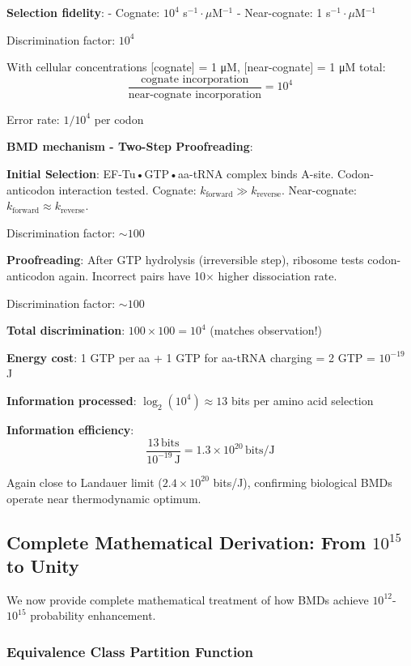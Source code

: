 \documentclass[11pt,onecolumn]{article}
\begin{document}
\textbf{Selection fidelity}: 
- Cognate: $10^4$ s$^{-1}\cdot\mu$M$^{-1}$
- Near-cognate: 1 s$^{-1}\cdot\mu$M$^{-1}$

Discrimination factor: $10^4$

With cellular concentrations [cognate] = 1 μM, [near-cognate] = 1 μM total:
\begin{equation}
\frac{\text{cognate incorporation}}{\text{near-cognate incorporation}} = 10^4
\end{equation}

Error rate: $1/10^4$ per codon

\textbf{BMD mechanism - Two-Step Proofreading}:

\textbf{Initial Selection}: EF-Tu•GTP•aa-tRNA complex binds A-site. Codon-anticodon interaction tested. Cognate: $k_{\text{forward}} \gg k_{\text{reverse}}$. Near-cognate: $k_{\text{forward}} \approx k_{\text{reverse}}$.

Discrimination factor: $\sim 100$

\textbf{Proofreading}: After GTP hydrolysis (irreversible step), ribosome tests codon-anticodon again. Incorrect pairs have 10$\times$ higher dissociation rate.

Discrimination factor: $\sim 100$

\textbf{Total discrimination}: $100 \times 100 = 10^4$ (matches observation!)

\textbf{Energy cost}: 1 GTP per aa + 1 GTP for aa-tRNA charging = 2 GTP = $10^{-19}$ J

\textbf{Information processed}: $\log_2(10^4) \approx 13$ bits per amino acid selection

\textbf{Information efficiency}:
\begin{equation}
\frac{13\,\text{bits}}{10^{-19}\,\text{J}} = 1.3 \times 10^{20}\,\text{bits/J}
\end{equation}

Again close to Landauer limit ($2.4 \times 10^{20}$ bits/J), confirming biological BMDs operate near thermodynamic optimum.

\subsection{Complete Mathematical Derivation: From $10^{15}$ to Unity}

We now provide complete mathematical treatment of how BMDs achieve $10^{12}$-$10^{15}$ probability enhancement.

\subsubsection{Equivalence Class Partition Function}
\end{document}
